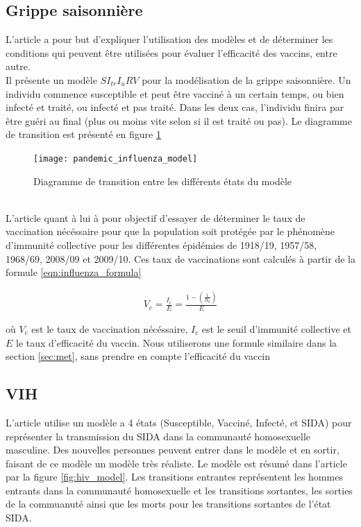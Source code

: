 \documentclass[journal, a4paper]{IEEEtran}
\begin{document}
	\subsection{Grippe saisonnière}
		L'article \cite{pandemic_influenza} a pour but d'expliquer l'utilisation des modèles et de déterminer les conditions qui peuvent être utilisées pour évaluer l'efficacité des vaccins, entre autre. \\
		Il présente un modèle $SI_{tr}I_uRV$ pour la modélisation de la grippe saisonnière. Un individu commence susceptible et peut être vacciné à un certain temps, ou bien infecté et traité, ou infecté et pas traité. Dans les deux cas, l'individu finira par être guéri au final (plus ou moins vite selon si il est traité ou pas). Le diagramme de transition est présenté en figure \ref{fig:pandemic_influenza_model}
		\begin{figure}[!hbt]
			\caption{Diagramme de transition entre les différents états du modèle}
			\texttt{[image: pandemic\_influenza\_model]}
			\label{fig:pandemic_influenza_model}
			\cite{pandemic_influenza}
		\end{figure} \\


		 L'article \cite{influenza_HIT} quant à lui à pour objectif d'essayer de déterminer le taux de vaccination nécéssaire pour que la population soit protégée par le phénomène d'immunité collective pour les différentes épidémies de 1918/19, 1957/58, 1968/69, 2008/09 et 2009/10. Ces taux de vaccinations sont calculés à partir de la formule \ref{eqn:influenza_formula}

		 \begin{equation}
		 \label{eqn:influenza_formula}
		 	\begin{aligned}
		 		V_c = \frac{I_c}{E} = \frac{1-(\frac{1}{R_0})}{E}
		 	\end{aligned}
		 \end{equation}

		 où $V_c$ est le taux de vaccination nécéssaire, $I_c$ est le seuil d'immunité collective et $E$ le taux d'efficacité du vaccin. Nous utiliserons une formule similaire dans la section \ref{sec:met}, sans prendre en compte l'efficacité du vaccin

	 \subsection{VIH}
	 L'article \cite{Imperfect_vaccines_and_herd_immunity_to_HIV_1993} utilise un modèle a 4 états (Susceptible, Vacciné, Infecté, et SIDA) pour représenter la transmission du SIDA dans la communauté homosexuelle masculine.
	 Des nouvelles personnes peuvent entrer dans le modèle et en sortir, faisant de ce modèle un modèle très réaliste. Le modèle est résumé dans l'article par la figure \ref{fig:hiv_model}. Les transitions entrantes représentent les hommes entrants dans la communauté homosexuelle et les transitions sortantes, les sorties de la commuanuté ainsi que les morts pour les transitions sortantes de l'état SIDA.
\end{document}
